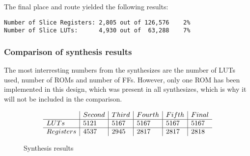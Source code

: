 

The final place and route yielded the following results:
\begin{verbatim}
Number of Slice Registers: 2,805 out of 126,576    2%
Number of Slice LUTs:      4,930 out of  63,288    7%
\end{verbatim}

\subsubsection{Comparison of synthesis results}
The most interresting numbers from the synthesizes are the number of 
LUTs used, number of ROMs and number of FFs. However, only one ROM has 
been implemented in this design, which was present in all synthesizes, 
which is why it will not be included in the comparison.
\begin{figure}[h!]
  \begin{equation}
    \begin{array}{l | l | l | l | l | l}
      & Second & Third & Fourth & Fifth & Final \\ \hline
      LUTs       & 5121   & 5167  & 5167   & 5167  & 5167  \\ \hline
      Registers  & 4537   & 2945  & 2817   & 2817  & 2818  \\
    \end{array}
  \end{equation}
  \caption{Synthesis results}
  \label{table:synthesis}
\end{figure}

